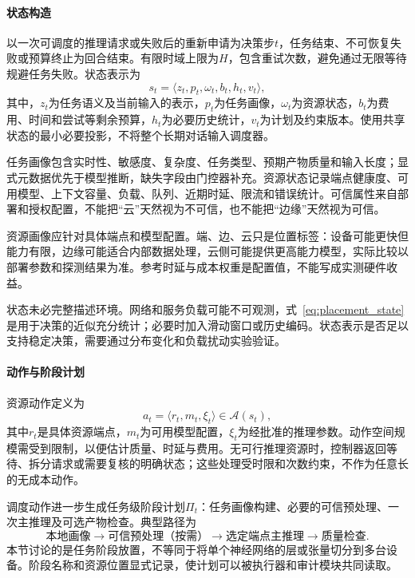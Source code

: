 \paragraph{状态构造}
以一次可调度的推理请求或失败后的重新申请为决策步$t$，任务结束、不可恢复失败或预算终止为回合结束。有限时域上限为$H$，包含重试次数，避免通过无限等待规避任务失败。状态表示为
\begin{equation}
s_t=\langle z_t,p_t,\omega_t,b_t,h_t,v_t\rangle,
\label{eq:placement_state}
\end{equation}
其中，$z_t$为任务语义及当前输入的表示，$p_t$为任务画像，$\omega_t$为资源状态，$b_t$为费用、时间和尝试等剩余预算，$h_t$为必要历史统计，$v_t$为计划及约束版本。使用共享状态的最小必要投影，不将整个长期对话输入调度器。

任务画像包含实时性、敏感度、复杂度、任务类型、预期产物质量和输入长度；显式元数据优先于模型推断，缺失字段由门控器补充。资源状态记录端点健康度、可用模型、上下文容量、负载、队列、近期时延、限流和错误统计。可信属性来自部署和授权配置，不能把“云”天然视为不可信，也不能把“边缘”天然视为可信。

资源画像应针对具体端点和模型配置。端、边、云只是位置标签：设备可能更快但能力有限，边缘可能适合内部数据处理，云侧可能提供更高能力模型，实际比较以部署参数和探测结果为准。参考时延与成本权重是配置值，不能写成实测硬件收益。

状态未必完整描述环境。网络和服务负载可能不可观测，式~\eqref{eq:placement_state}是用于决策的近似充分统计；必要时加入滑动窗口或历史编码。状态表示是否足以支持稳定决策，需要通过分布变化和负载扰动实验验证。

\paragraph{动作与阶段计划}
资源动作定义为
\begin{equation}
a_t=\langle r_t,m_t,\xi_t\rangle\in\mathcal{A}(s_t),
\end{equation}
其中$r_t$是具体资源端点，$m_t$为可用模型配置，$\xi_t$为经批准的推理参数。动作空间规模需受到限制，以便估计质量、时延与费用。无可行推理资源时，控制器返回等待、拆分请求或需要复核的明确状态；这些处理受时限和次数约束，不作为任意长的无成本动作。

调度动作进一步生成任务级阶段计划$\Pi_t$：任务画像构建、必要的可信预处理、一次主推理及可选产物检查。典型路径为
\begin{equation}
\text{本地画像}\rightarrow\text{可信预处理（按需）}
\rightarrow\text{选定端点主推理}\rightarrow\text{质量检查}.
\end{equation}
本节讨论的是任务阶段放置，不等同于将单个神经网络的层或张量切分到多台设备。阶段名称和资源位置显式记录，使计划可以被执行器和审计模块共同读取。


